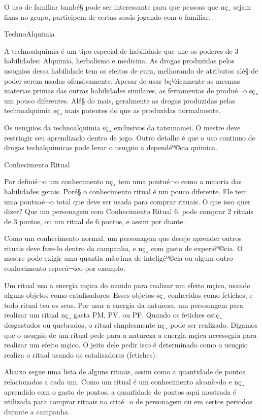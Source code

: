 O uso de familiar també§ pode ser interessante para que pessoas que nç¸ sejam fixas no grupo, participem de certas sessîs jogando com o familiar.
 
 
 TechnoAlquimia
 
 A technoalquimia é um tipo especial de habilidade que une os poderes de 3 habilidades: Alquimia, herbalismo e medicina. As drogas produzidas pelos usuçµios dessa habilidade tem os efeitos de cura, melhorando de atributos alé§ de poder serem usadas ofensivamente. Apesar de usar bç½icamente as mesmas materias primas das outras habilidades similares, as ferramentas de produé¬o sç¸ um pouco diferentes. Alé§ do mais, geralmente as drogas produzidas pelas technoalquimia sç¸ mais potentes do que as produzidas normalmente. 
 
Os usuçµios da technoalquimia sç¸ exclusivos da tatsunamei. O mestre deve restringir seu aprendizado dentro de jogo. Outro detalhe é que o uso continuo de drogas techalquimicas pode levar o usuçµio a dependéº©cia quimica.
 
 
Conhecimento Ritual
 
Por definié¬o um conhecimento nç¸ tem uma pontué¬o como a maioria das habilidades gerais. Poré§ o conhecimento ritual é um pouco diferente. Ele tem uma pontuaé¬o total que deve ser usada para comprar rituais. O que isso quer dizer? Que um personagem com Conhecimento Ritual 6, pode comprar 2 rituais de 3 pontos, ou um ritual de 6 pontos, e assim por diante.

Como um conhecimento normal, um personagem que deseje aprender outros rituais deve faze-lo dentro da campanha, e nç¸ com gasto de experiéº©cia. O mestre pode exigir uma quantia må¤ima de inteligéº©cia ou algum outro conhecimento especå¬ico por exemplo.

Um ritual usa a energia mçica do mundo para realizar um efeito mçico, usando alguns objetos como catalisadores. Esses objetos sç¸ conhecidos como fetiches, e todo ritual teu os seus. Por usar a energia da natureza, um personagem para realizar um ritual nç¸ gasta PM, PV, ou PF. Quando os fetiches estç¸ desgastados ou quebrados, o ritual simplesmente nç¸ pode ser realizado. Digamos que o usuçµio de um ritual pede para a natureza a energia mçica necessçµia para realizar um efeito mçico. O jeito dele pedir isso é determinado como o usuçµio realiza o ritual usando os catalisadores (fetiches).
 
Abaixo segue uma lista de alguns rituais, assim como a quantidade de pontos relacionados a cada um. Como um ritual é um conhecimento alcanè»do e nç¸ aprendido com o gasto de pontos, a quantidade de pontos aqui mostrada é utilizada para comprar rituais na criaé¬o de personagem ou em certos periodos durante a campanha. 
 
